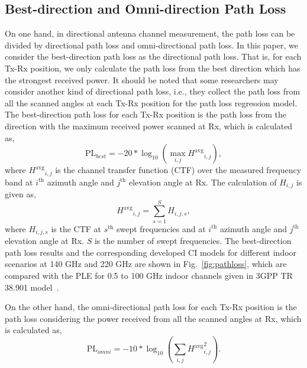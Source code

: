 \documentclass[conference]{IEEEtran}
\begin{document}
\subsection{Best-direction and Omni-direction Path Loss}
On one hand, in directional antenna channel measurement, the path loss can be divided by directional path loss and omni-directional path loss. In this paper, we consider the best-direction path loss as the directional path loss. That is, for each Tx-Rx position, we only calculate the path loss from the best direction which has the strongest received power. It should be noted that some researchers may consider another kind of directional path loss, i.e., they collect the path loss from all the scanned angles at each Tx-Rx position for the path loss regression model. The best-direction path loss for each Tx-Rx position is the path loss from the direction with the maximum received power scanned at Rx, which is calculated as,
\begin{equation}
    \text{PL}_{best}=-20*\log_{10}{(\max_{i,j}{{H^{\text{avg}}}_{i,j}})},
\end{equation}
where ${H^{\text{avg}}}_{i,j}$ is the channel transfer function (CTF) over the measured frequency band at $i^{\text{th}}$ azimuth angle and $j^{\text{th}}$ elevation angle at Rx. The calculation of ${H}_{i,j}$ is given as,
\begin{equation}
    {H^{\text{avg}}}_{i,j}=\sum_{s=1}^{S}H_{i,j,s},
\end{equation}
where $H_{i,j,s}$ is the CTF at $s^{\text{th}}$ swept frequencies and at $i^{\text{th}}$ azimuth angle and $j^{\text{th}}$ elevation angle at Rx. $S$ is the number of swept frequencies. The best-direction path loss results and the corresponding developed CI models for different indoor scenarios at 140 GHz and 220 GHz are shown in Fig.~\ref{fig:pathloss}, which are compared with the PLE for 0.5 to 100 GHz indoor channels given in 3GPP TR 38.901 model~\cite{3gpp2018study}.
\par On the other hand, the omni-directional path loss for each Tx-Rx position is the path loss considering the  power received from all the scanned angles at Rx, which is calculated as,
\begin{equation}
    \text{PL}_{omni}=-10*\log_{10}{(\sum_{i,j}{{H^{\text{avg}}}^2_{i,j}})}.
\end{equation}
\end{document}
